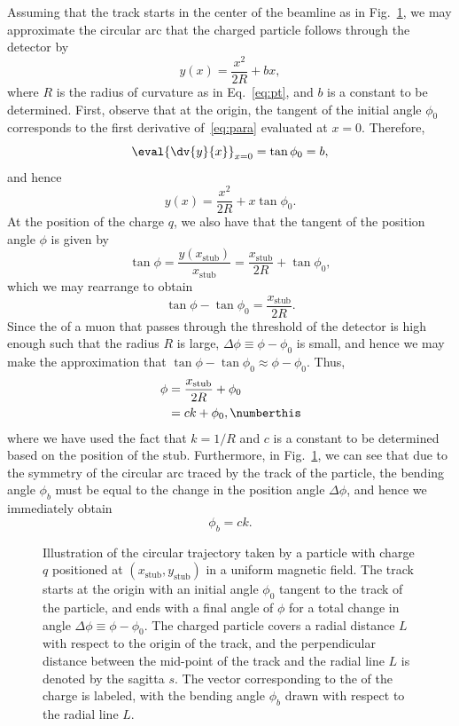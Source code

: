Assuming that the track starts in the center of the beamline as in Fig.~\ref{fig:arc}, we may approximate the circular arc that the charged particle follows through the detector by
\begin{equation}\label{eq:para}
  y(x)=\frac{x^2}{2R}+bx,
\end{equation}
where $R$ is the radius of curvature as in Eq.~\ref{eq:pt}, and $b$ is a constant to be determined.
First, observe that at the origin, the tangent of the initial angle $\phi_0$ corresponds to the first derivative of~\ref{eq:para} evaluated at $x=0$. Therefore,
\begin{equation}
  \eval{\dv{y}{x}}_{x=0}=\tan\phi_0=b,
\end{equation}
and hence
\begin{equation}
  y(x)=\frac{x^2}{2R}+x\tan\phi_0.
\end{equation}
At the position of the charge $q$, we also have that the tangent of the position angle $\phi$ is given by
\begin{equation}
  \tan\phi=\frac{y(x_\mathrm{stub})}{x_\mathrm{stub}}=\frac{x_\mathrm{stub}}{2R}+\tan\phi_0,
\end{equation}
which we may rearrange to obtain
\begin{equation}
  \tan\phi-\tan\phi_0=\frac{x_\mathrm{stub}}{2R}.
\end{equation}
Since the \pt of a muon that passes through the threshold of the detector is high enough such that the radius $R$ is large, $\Delta\phi\equiv\phi-\phi_0$ is small, and hence we may make the approximation that $\tan\phi-\tan\phi_0\approx\phi-\phi_0$.
Thus,
\begin{align*}\label{eq:phi}
  \phi &= \frac{x_\mathrm{stub}}{2R}+\phi_0\\
  &= ck+\phi_0,
  \numberthis
\end{align*}
where we have used the fact that $k=1/R$ and $c$ is a constant to be determined based on the position of the stub.
Furthermore, in Fig.~\ref{fig:arc}, we can see that due to the symmetry of the circular arc traced by the track of the particle, the bending angle $\phi_b$ must be equal to the change in the position angle $\Delta\phi$, and hence we immediately obtain
\begin{equation}\label{eq:phib}
  \phi_b=ck.
\end{equation}

\begin{figure}[htbp]
  \centering
  
  \caption{Illustration of the circular trajectory taken by a particle with charge $q$ positioned at $(x_\mathrm{stub},y_\mathrm{stub})$ in a uniform magnetic field. The track starts at the origin with an initial angle $\phi_0$ tangent to the track of the particle, and ends with a final angle of $\phi$ for a total change in angle $\Delta\phi\equiv\phi-\phi_0$. The charged particle covers a radial distance $L$ with respect to the origin of the track, and the perpendicular distance between the mid-point of the track and the radial line $L$ is denoted by the sagitta $s$. The vector corresponding to the \pt of the charge is labeled, with the bending angle $\phi_b$ drawn with respect to the radial line $L$.}
  \label{fig:arc}
\end{figure}

